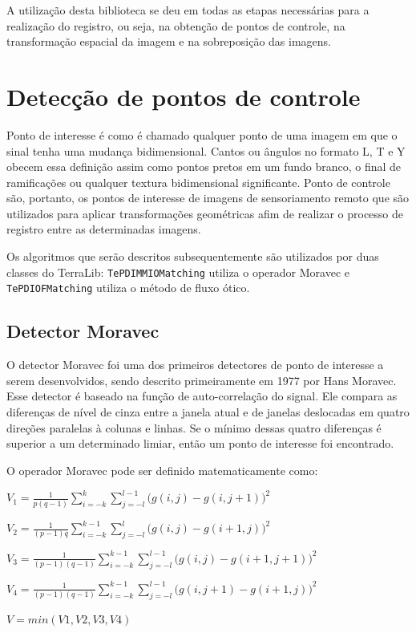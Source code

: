 \documentclass[9pt, a4paper, nofonttune, journal]{IEEEtran}
\begin{document}
A utilização desta biblioteca se deu em todas as etapas necessárias para a realização do registro, ou seja, na obtenção de pontos de controle,
na transformação espacial da imagem e na sobreposição das imagens.


\section{Detecção de pontos de controle}
Ponto de interesse é como é chamado qualquer ponto de uma imagem em que o sinal tenha uma mudança bidimensional. Cantos ou ângulos
no formato L, T e Y obecem essa definição assim como pontos pretos em um fundo branco, o final de ramificações ou qualquer textura bidimensional
significante.\cite{Coderlia1}
Ponto de controle são, portanto, os pontos de interesse de imagens de sensoriamento remoto que são utilizados para aplicar transformações geométricas
afim de realizar o processo de registro entre as determinadas imagens.\cite{Schowengerdt}

Os algoritmos que serão descritos subsequentemente são utilizados por duas classes do TerraLib:
\texttt{TePDIMMIOMatching} utiliza o operador Moravec e \texttt{TePDIOFMatching} utiliza o método de fluxo ótico.
\subsection{Detector Moravec}
O detector Moravec foi uma dos primeiros detectores de ponto de interesse a serem desenvolvidos, sendo descrito primeiramente 
em 1977 por Hans Moravec.\cite{Moravec1}
Esse detector é baseado na função de auto-correlação do signal. Ele compara as diferenças de nível de cinza entre a janela atual e de janelas 
deslocadas em quatro direções paralelas à colunas e linhas. Se o mínimo dessas quatro diferenças é superior a um determinado limiar, então um ponto de interesse
foi encontrado.\cite{Coderlia1}
  
O operador Moravec pode ser definido matematicamente como:
    \begin{center}$V_{1}=\frac{1}{p(q-1)}\sum_{i=-k}^k\sum_{j=-l}^{l-1}\bigl(g(i,j)-g(i,j+1)\bigr)^2$    \end{center}
    \begin{center}$V_{2}=\frac{1}{(p-1)q}\sum_{i=-k}^{k-1}\sum_{j=-l}^l\bigl(g(i,j)-g(i+1,j)\bigr)^2$    \end{center}
    \begin{center}$V_{3}=\frac{1}{(p-1)(q-1)}\sum_{i=-k}^{k-1}\sum_{j=-l}^{l-1}\bigl(g(i,j)-g(i+1,j+1)\bigr)^2$\end{center}
    \begin{center}$V_{4}=\frac{1}{(p-1)(q-1)}\sum_{i=-k}^{k-1}\sum_{j=-l}^{l-1}\bigl(g(i,j+1)-g(i+1,j)\bigr)^2$\end{center}
    \begin{center}$V = min(V1,V2,V3,V4)$\end{center}
\end{document}
